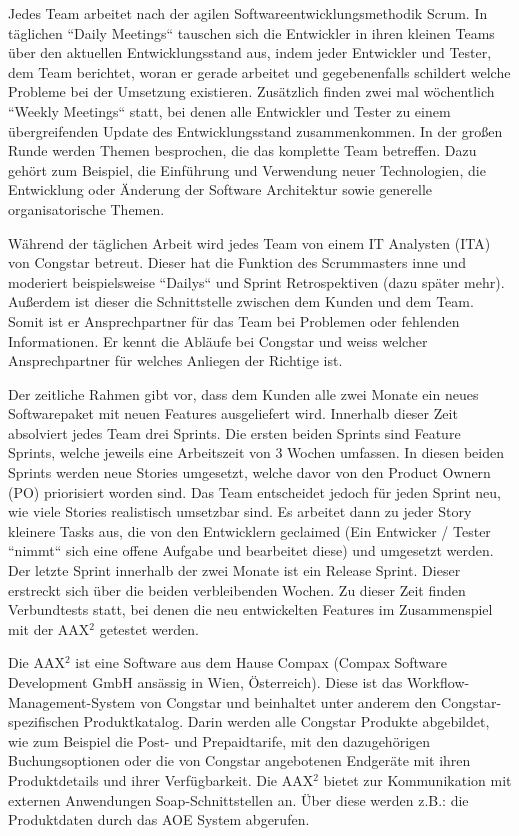 \documentclass[11pt,a4paper]{article}
\begin{document}
Jedes Team arbeitet nach der agilen Softwareentwicklungsmethodik Scrum.
In täglichen “Daily Meetings“ tauschen sich die Entwickler in ihren kleinen Teams über den aktuellen Entwicklungsstand aus, indem jeder Entwickler und Tester, dem Team berichtet, woran er gerade arbeitet und gegebenenfalls schildert welche Probleme bei der Umsetzung existieren.
Zusätzlich finden zwei mal wöchentlich “Weekly Meetings“ statt, bei denen alle Entwickler und Tester zu einem übergreifenden Update des Entwicklungsstand zusammenkommen.
In der großen Runde werden Themen besprochen, die das komplette Team betreffen.
Dazu gehört zum Beispiel, die Einführung und Verwendung neuer Technologien, die Entwicklung oder Änderung der Software Architektur sowie generelle organisatorische Themen.

Während der täglichen Arbeit wird jedes Team von einem IT Analysten (ITA) von Congstar betreut. Dieser hat die Funktion des Scrummasters inne und moderiert beispielsweise “Dailys“ und Sprint Retrospektiven (dazu später mehr). Außerdem ist dieser die Schnittstelle zwischen dem Kunden und dem Team. Somit ist er Ansprechpartner für das Team bei Problemen oder fehlenden Informationen. Er kennt die Abläufe bei Congstar und weiss welcher Ansprechpartner für welches Anliegen der Richtige ist.

Der zeitliche Rahmen gibt vor, dass dem Kunden alle zwei Monate ein neues Softwarepaket mit neuen Features ausgeliefert wird.
Innerhalb dieser Zeit absolviert jedes Team drei Sprints. Die ersten beiden Sprints sind Feature Sprints, welche jeweils eine Arbeitszeit von 3 Wochen umfassen. In diesen beiden Sprints werden neue Stories umgesetzt, welche davor von den Product Ownern (PO) priorisiert worden sind. Das Team entscheidet jedoch für jeden Sprint neu, wie viele Stories realistisch umsetzbar sind. 
Es arbeitet dann zu jeder Story kleinere Tasks aus, die von den Entwicklern geclaimed (Ein Entwicker / Tester “nimmt“ sich eine offene Aufgabe und bearbeitet diese) und umgesetzt werden. Der letzte Sprint innerhalb der zwei Monate ist ein Release Sprint.
Dieser erstreckt sich über die beiden verbleibenden Wochen. Zu dieser Zeit finden Verbundtests statt, bei denen die neu entwickelten Features im Zusammenspiel mit der AAX$^{2}$ getestet werden.


\par
\begingroup
\leftskip=1cm %
\noindent Die AAX$^{2}$ ist eine Software aus dem Hause Compax (Compax Software Development GmbH ansässig in Wien, Österreich). Diese ist das Workflow-Management-System von Congstar und beinhaltet unter anderem den Congstar-spezifischen Produktkatalog.
Darin werden alle Congstar Produkte abgebildet, wie zum Beispiel die Post- und Prepaidtarife, mit den dazugehörigen Buchungsoptionen oder die von Congstar angebotenen Endgeräte mit ihren Produktdetails und ihrer Verfügbarkeit.
Die AAX$^{2}$ bietet zur Kommunikation mit externen Anwendungen Soap-Schnittstellen an. Über diese werden z.B.: die Produktdaten durch das AOE System abgerufen.
\par
\endgroup
\end{document}
